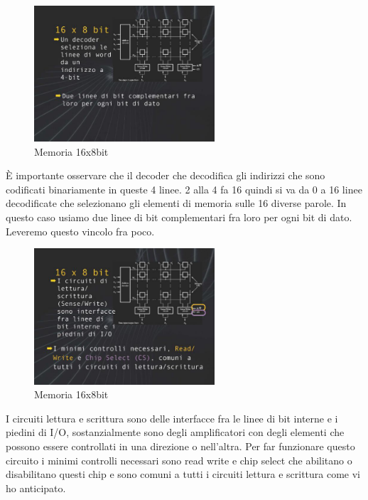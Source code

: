 \FloatBarrier
\begin{figure}[H]
  \centering
  \includegraphics[width=0.60\textwidth,
                    trim=40 40 10 40, %
                    clip]
                    {images/Lez04_p02_fig_01.png}
  \caption{Memoria 16x8bit}
  \label{fig:Lez04_p02_fig_01}
\end{figure}
\FloatBarrier
\noindent

È importante osservare che il decoder che decodifica gli indirizzi che sono codificati binariamente in queste 4 linee.
2 alla 4 fa 16 quindi si va da 0 a 16 linee decodificate che selezionano gli elementi di memoria sulle 16 diverse parole.
In questo caso usiamo due linee di bit complementari fra loro per ogni bit di dato. Leveremo questo vincolo fra poco.

\FloatBarrier
\begin{figure}[H]
  \centering
  \includegraphics[width=0.60\textwidth,
                    trim=40 40 10 40, %
                    clip]
                    {images/Lez04_p02_fig_02.png}
  \caption{Memoria 16x8bit}
  \label{fig:Lez04_p02_fig_02}
\end{figure}
\FloatBarrier
\noindent


I circuiti lettura e scrittura sono delle interfacce fra le linee di bit interne e i piedini di I/O, sostanzialmente sono degli amplificatori con degli elementi che possono essere controllati in una direzione o nell'altra.
Per far funzionare questo circuito i minimi controlli necessari sono read write e chip select che abilitano o disabilitano questi chip e sono comuni a tutti i circuiti lettura e scrittura come vi ho anticipato.

